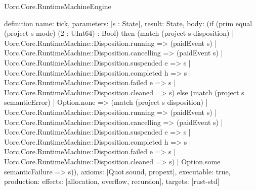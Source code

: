 \begin{lexlean}{Uorc.Core.RuntimeMachineEngine}
\begin{semanticmodule}
definition{
  name: tick,
  parameters: [s : State],
  result: State,
  body: (if (prim equal (project s mode) (2 : UInt64) : Bool) then (match (project s disposition)
    | Uorc.Core.RuntimeMachine::Disposition.running => (paidEvent s)
    | Uorc.Core.RuntimeMachine::Disposition.cancelling => (paidEvent s)
    | Uorc.Core.RuntimeMachine::Disposition.suspended e => s
    | Uorc.Core.RuntimeMachine::Disposition.completed h => s
    | Uorc.Core.RuntimeMachine::Disposition.failed e => s
    | Uorc.Core.RuntimeMachine::Disposition.cleaned => s) else (match (project s semanticError)
    | Option.none => (match (project s disposition)
      | Uorc.Core.RuntimeMachine::Disposition.running => (paidEvent s)
      | Uorc.Core.RuntimeMachine::Disposition.cancelling => (paidEvent s)
      | Uorc.Core.RuntimeMachine::Disposition.suspended e => s
      | Uorc.Core.RuntimeMachine::Disposition.completed h => s
      | Uorc.Core.RuntimeMachine::Disposition.failed e => s
      | Uorc.Core.RuntimeMachine::Disposition.cleaned => s)
    | Option.some semanticFailure => s)),
  axioms: [Quot.sound, propext],
  executable: true,
  production: {effects: [allocation, overflow, recursion], targets: [rust-std]}
}


\end{semanticmodule}
\end{lexlean}
